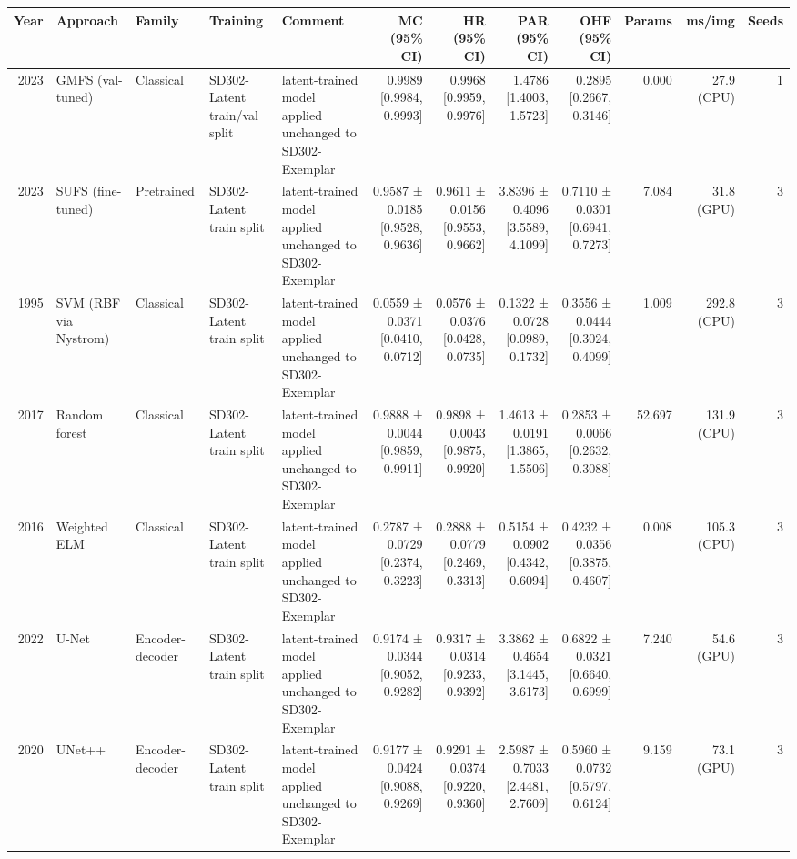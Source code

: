 \begin{table}[t]
\centering
\small
\begin{tabular}{rllllrrrrrrr}
\toprule
Year & Approach & Family & Training & Comment & MC (95\% CI) & HR (95\% CI) & PAR (95\% CI) & OHF (95\% CI) & Params & ms/img & Seeds \\
\midrule
2023 & GMFS (val-tuned) & Classical & SD302-Latent train/val split & latent-trained model applied unchanged to SD302-Exemplar & 0.9989 [0.9984, 0.9993] & 0.9968 [0.9959, 0.9976] & 1.4786 [1.4003, 1.5723] & 0.2895 [0.2667, 0.3146] & 0.000 & 27.9 (CPU) & 1 \\
2023 & SUFS (fine-tuned) & Pretrained & SD302-Latent train split & latent-trained model applied unchanged to SD302-Exemplar & 0.9587 ± 0.0185 [0.9528, 0.9636] & 0.9611 ± 0.0156 [0.9553, 0.9662] & 3.8396 ± 0.4096 [3.5589, 4.1099] & 0.7110 ± 0.0301 [0.6941, 0.7273] & 7.084 & 31.8 (GPU) & 3 \\
1995 & SVM (RBF via Nystrom) & Classical & SD302-Latent train split & latent-trained model applied unchanged to SD302-Exemplar & 0.0559 ± 0.0371 [0.0410, 0.0712] & 0.0576 ± 0.0376 [0.0428, 0.0735] & 0.1322 ± 0.0728 [0.0989, 0.1732] & 0.3556 ± 0.0444 [0.3024, 0.4099] & 1.009 & 292.8 (CPU) & 3 \\
2017 & Random forest & Classical & SD302-Latent train split & latent-trained model applied unchanged to SD302-Exemplar & 0.9888 ± 0.0044 [0.9859, 0.9911] & 0.9898 ± 0.0043 [0.9875, 0.9920] & 1.4613 ± 0.0191 [1.3865, 1.5506] & 0.2853 ± 0.0066 [0.2632, 0.3088] & 52.697 & 131.9 (CPU) & 3 \\
2016 & Weighted ELM & Classical & SD302-Latent train split & latent-trained model applied unchanged to SD302-Exemplar & 0.2787 ± 0.0729 [0.2374, 0.3223] & 0.2888 ± 0.0779 [0.2469, 0.3313] & 0.5154 ± 0.0902 [0.4342, 0.6094] & 0.4232 ± 0.0356 [0.3875, 0.4607] & 0.008 & 105.3 (CPU) & 3 \\
2022 & U-Net & Encoder-decoder & SD302-Latent train split & latent-trained model applied unchanged to SD302-Exemplar & 0.9174 ± 0.0344 [0.9052, 0.9282] & 0.9317 ± 0.0314 [0.9233, 0.9392] & 3.3862 ± 0.4654 [3.1445, 3.6173] & 0.6822 ± 0.0321 [0.6640, 0.6999] & 7.240 & 54.6 (GPU) & 3 \\
2020 & UNet++ & Encoder-decoder & SD302-Latent train split & latent-trained model applied unchanged to SD302-Exemplar & 0.9177 ± 0.0424 [0.9088, 0.9269] & 0.9291 ± 0.0374 [0.9220, 0.9360] & 2.5987 ± 0.7033 [2.4481, 2.7609] & 0.5960 ± 0.0732 [0.5797, 0.6124] & 9.159 & 73.1 (GPU) & 3 \\

\end{tabular}
\end{table}
